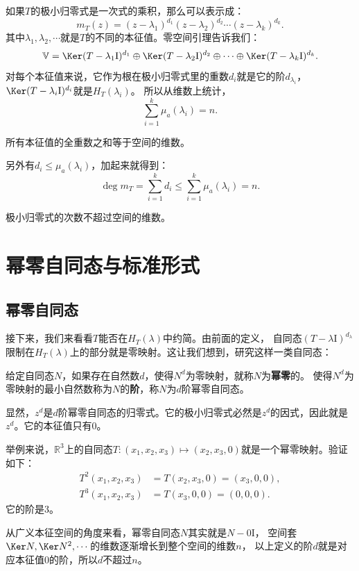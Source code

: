 \documentclass[12pt,UTF8]{ctexbook}
\begin{document}
如果$T$的极小归零式是一次式的乘积，那么可以表示成：
$$ m_T(z) = (z - \lambda_1)^{d_1} (z - \lambda_2)^{d_2} \cdots  (z - \lambda_k)^{d_k}.$$
其中$\lambda_1, \lambda_2,\cdots$就是$T$的不同的本征值。零空间引理告诉我们：
$$ \mathbb{V} = \Ker (T - \lambda_1\mathrm{I})^{d_1} \oplus \Ker (T - \lambda_2\mathrm{I})^{d_2} \oplus \cdots \oplus \Ker (T - \lambda_k\mathrm{I})^{d_k}.$$
对每个本征值来说，它作为根在极小归零式里的重数$d_i$就是它的阶$d_{\lambda_i}$，
$\Ker (T - \lambda_i\mathrm{I})^{d_i}$就是$H_T(\lambda_i)$。
所以从维数上统计，
$$ \sum_{i=1}^k \mu_a(\lambda_i) = n.$$
\begin{pp}\label{pp:6_12_2_1}
    所有本征值的全重数之和等于空间的维数。
\end{pp}

另外有$d_i \leqslant \mu_a(\lambda_i)$，加起来就得到：
$$ \deg m_T = \sum_{i=1}^k d_i \leqslant \sum_{i=1}^k \mu_a(\lambda_i) = n.$$
\begin{pp}\label{pp:6_12_2_2}
    极小归零式的次数不超过空间的维数。
\end{pp}

\section{幂零自同态与标准形式}
\subsection{幂零自同态}
接下来，我们来看看$T$能否在$H_T(\lambda)$中约简。由前面的定义，
自同态$(T - \lambda\mathrm{I})^{d_\lambda}$限制在$H_T(\lambda)$上的部分就是零映射。这让我们想到，研究这样一类自同态：
\begin{df}\label{df:6_4_4}
    给定自同态$N$，如果存在自然数$d$，使得$N^d$为零映射，就称$N$为\textbf{幂零}的。
    使得$N^d$为零映射的最小自然数称为$N$的\textbf{阶}，称$N$为$d$阶幂零自同态。
\end{df}

显然，$z^d$是$d$阶幂零自同态的归零式。它的极小归零式必然是$z^d$的因式，因此就是$z^d$。它的本征值只有0。

举例来说，$\mathbb{R}^3$上的自同态$T: (x_1, x_2, x_3) \mapsto (x_2, x_3, 0)$就是一个幂零映射。验证如下：
\begin{align*}
    T^2(x_1, x_2, x_3) &= T(x_2, x_3, 0) = (x_3, 0, 0),  \\
    T^3(x_1, x_2, x_3) &= T(x_3, 0, 0) =  (0, 0, 0).
\end{align*}
它的阶是3。

从广义本征空间的角度来看，幂零自同态$N$其实就是$N - 0\mathrm{I}$，
空间套$\Ker N, \Ker N^2, \cdots$的维数逐渐增长到整个空间的维数$n$，
以上定义的阶$d$就是对应本征值$0$的阶，所以$d$不超过$n$。
\end{document}

